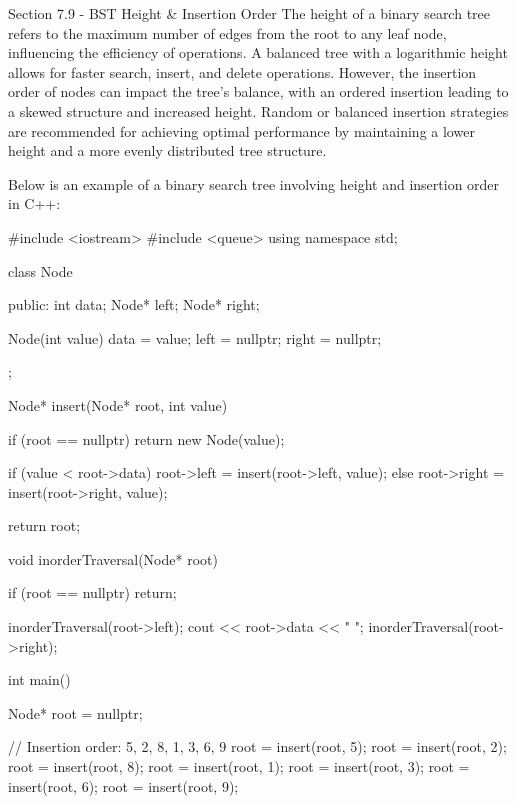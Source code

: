 \begin{notes}{Section 7.9 - BST Height \& Insertion Order}
    The height of a binary search tree refers to the maximum number of edges from the root to any leaf node, influencing the efficiency of operations. A balanced tree with a logarithmic height allows for faster search, insert, and delete operations. However, the insertion order of nodes can impact the tree's balance, with an ordered insertion 
    leading to a skewed structure and increased height. Random or balanced insertion strategies are recommended for achieving optimal performance by maintaining a lower height and a more evenly distributed tree structure.
    
    \begin{highlight}
        Below is an example of a binary search tree involving height and insertion order in C++:
    
    \begin{code}[C++]
    #include <iostream>
    #include <queue>
    using namespace std;
    
    class Node {
    public:
        int data;
        Node* left;
        Node* right;
    
        Node(int value) {
            data = value;
            left = nullptr;
            right = nullptr;
        }
    };
    
    Node* insert(Node* root, int value) {
        if (root == nullptr) {
            return new Node(value);
        }
    
        if (value < root->data) {
            root->left = insert(root->left, value);
        } else {
            root->right = insert(root->right, value);
        }
    
        return root;
    }
    
    void inorderTraversal(Node* root) {
        if (root == nullptr) {
            return;
        }
    
        inorderTraversal(root->left);
        cout << root->data << " ";
        inorderTraversal(root->right);
    }
    
    int main() {
        Node* root = nullptr;
    
        // Insertion order: 5, 2, 8, 1, 3, 6, 9
        root = insert(root, 5);
        root = insert(root, 2);
        root = insert(root, 8);
        root = insert(root, 1);
        root = insert(root, 3);
        root = insert(root, 6);
        root = insert(root, 9);
    
}
\end{code}
\end{highlight}
\end{notes}
